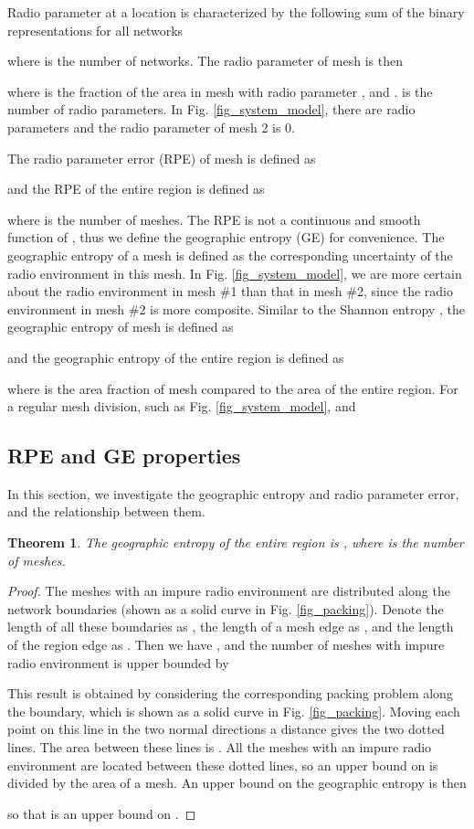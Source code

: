 \documentclass[conference]{IEEEtran}
\newtheorem{Theo}{Theorem}
\begin{document}
Radio parameter at a location is characterized by the following sum of the binary representations for all networks \cite{CPC_Ondemand}

where  is the number of networks.
The radio parameter of mesh  is then

where  is the fraction of the area in mesh  with radio parameter ,
and .
 is the number of radio parameters.
In Fig. \ref{fig_system_model}, there are  radio parameters and the radio parameter of mesh 2 is 0.

The radio parameter error (RPE) of mesh  is defined as

and the RPE of the entire region is defined as

where  is the number of meshes.
The RPE is not a continuous and smooth function of , thus we define the geographic entropy (GE) for convenience.
The geographic entropy of a mesh is defined as the corresponding uncertainty of the radio environment in this mesh.
In Fig. \ref{fig_system_model}, we are more certain about the radio environment in mesh \#1 than that in mesh \#2, since the radio environment
in mesh \#2 is more composite.
Similar to the Shannon entropy \cite{Cover}, the geographic entropy of mesh  is defined as

and the geographic entropy of the entire region is defined as

where  is the area fraction of mesh  compared to the area of the entire region.
For a regular mesh division, such as Fig. \ref{fig_system_model},  and


\subsection{RPE and GE properties}
In this section, we investigate the geographic entropy and radio parameter error,
and the relationship between them.
\begin{Theo}
\label{th_jiangshang}
The geographic entropy of the entire region is ,
where  is the number of meshes.
\end{Theo}
\begin{proof}
The meshes with an impure radio environment are distributed along the network boundaries (shown as a solid curve in Fig. \ref{fig_packing}).
Denote the length of all these boundaries as , the length of a mesh edge as , and the length of the region edge as .
Then we have , and
the number of meshes with impure radio environment is upper bounded by

This result is obtained by considering the corresponding packing problem along the boundary, which is
shown as a solid curve in Fig. \ref{fig_packing}.
Moving each point on this line in the two normal directions a distance  gives the two dotted lines.
The area between these lines is .
All the meshes with an impure radio environment are located between these dotted lines, so
an upper bound on  is  divided by the area of a mesh.
An upper bound on the geographic entropy is then

so that  is an upper bound on .
\end{proof}
\end{document}
